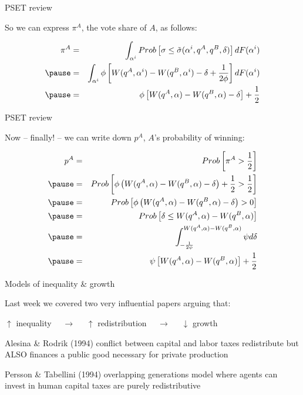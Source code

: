 \documentclass[aspectratio=169]{beamer}
\begin{document}
\begin{frame}{PSET review}

So we can express $\pi^A$, the vote share of $A$, as follows:

\begin{eqnarray*}
\pi^A &=& \int_{\alpha^i} Prob \left[ \sigma \leq \tilde{\sigma}(\alpha^i, q^A, q^B, \delta) \right] dF(\alpha^i) \\
\pause
&=& \int_{\alpha^i} \phi \left[ W(q^A, \alpha^i) - W(q^B, \alpha^i) - \delta + \frac{1}{2 \phi} \right] dF(\alpha^i) \\
\pause
&=& \phi \left[ W(q^A, \alpha) - W(q^B, \alpha) - \delta \right] + \frac{1}{2}
\end{eqnarray*}


\end{frame}
\begin{frame}{PSET review}

Now -- finally! -- we can write down $p^A$, $A$'s probability of winning:

\vspace{-1em}
\begin{eqnarray*}
p^A &=& Prob \left[ \pi^A > \frac{1}{2} \right]  \\
\pause
&=& Prob \left[ \phi \left( W(q^A, \alpha) - W(q^B, \alpha) - \delta \right) + \frac{1}{2} > \frac{1}{2} \right] \\
\pause
&=& Prob \left[ \phi \left( W(q^A, \alpha) - W(q^B, \alpha) - \delta \right) >0 \right] \\
\pause
&=& Prob \left[ \delta \leq W(q^A, \alpha) - W(q^B, \alpha) \right] \\
\pause
&=& \int_{-\frac{1}{2\psi}}^{W(q^A, \alpha) - W(q^B, \alpha)} \psi d \delta \\
\pause
&=& \psi \left[ W(q^A, \alpha) - W(q^B, \alpha) \right] + \frac{1}{2}
\end{eqnarray*}

\end{frame}

\begin{frame}{Models of inequality \& growth}

Last week we covered two very influential papers arguing that:

\begin{tcolorbox}
$\uparrow$ inequality \, \,  $\rightarrow$  \, \,  $\uparrow$ redistribution  \, \,  $\rightarrow$  \, \,  $\downarrow$ growth
\end{tcolorbox}

\pause 

\begin{outline}
\1 Alesina \& Rodrik (1994) 
\2 conflict between capital and labor
\2 taxes redistribute but ALSO finances a public good necessary for private production

\1 Persson \& Tabellini (1994) 
\2 overlapping generations model where agents can invest in human capital
\2 taxes are purely redistributive
\end{outline}


\end{frame}
\end{document}
